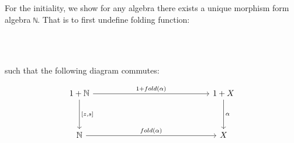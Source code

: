 \begin{code}%
\>[0]\AgdaFunction{[z,s]}\AgdaSpace{}%
\AgdaSymbol{:}\AgdaSpace{}%
\AgdaSpace{}%
\AgdaSpace{}%
\AgdaSpace{}%
\AgdaSpace{}%
\<%
\\
\>[0]\AgdaFunction{[z,s]}\AgdaSpace{}%
\AgdaSymbol{(}\AgdaSpace{}%
\AgdaSymbol{)}\AgdaSpace{}%
\AgdaSymbol{=}\AgdaSpace{}%
\<%
\\
\>[0]\AgdaFunction{[z,s]}\AgdaSpace{}%
\AgdaSymbol{(}\AgdaSpace{}%
\AgdaSymbol{)}\AgdaSpace{}%
\AgdaSymbol{=}\AgdaSpace{}%
\AgdaSpace{}%
\<%
\end{code}

For the initiality, we show for any algebra there exists a unique morphism form algebra \texttt{ℕ}. That is to first undefine folding function:

\begin{code}%
\>[0]\AgdaSpace{}%
\AgdaSymbol{:}\AgdaSpace{}%
\AgdaSymbol{(}\AgdaSpace{}%
\AgdaSpace{}%
\AgdaSpace{}%
\AgdaSpace{}%
\AgdaSymbol{)}\AgdaSpace{}%
\AgdaSpace{}%
\AgdaSpace{}%
\AgdaSpace{}%
\<%
\\
\>[0]\AgdaSpace{}%
\AgdaSpace{}%
\AgdaSpace{}%
\AgdaSymbol{=}\AgdaSpace{}%
\AgdaSpace{}%
\AgdaSymbol{(}\AgdaSpace{}%
\AgdaSymbol{)}\<%
\\
\>[0]\AgdaSpace{}%
\AgdaSpace{}%
\AgdaSymbol{(}\AgdaSpace{}%
\AgdaSymbol{)}\AgdaSpace{}%
\AgdaSymbol{=}\AgdaSpace{}%
\AgdaSpace{}%
\AgdaSymbol{(}\AgdaSpace{}%
\AgdaSymbol{(}\AgdaSpace{}%
\AgdaSpace{}%
\AgdaSymbol{))}\<%
\end{code}

such that the following diagram commutes:

\[
\begin{tikzcd}[row sep=huge, column sep=5cm]
1 + \mathbb{N} \arrow[r, "1 + fold(\alpha)"] \arrow[d, "{[z,s]}"]
& 1 + X \arrow[d, "\alpha"] \\
\mathbb{N} \arrow[r, "fold(\alpha)"]
& X
\end{tikzcd}
\]

